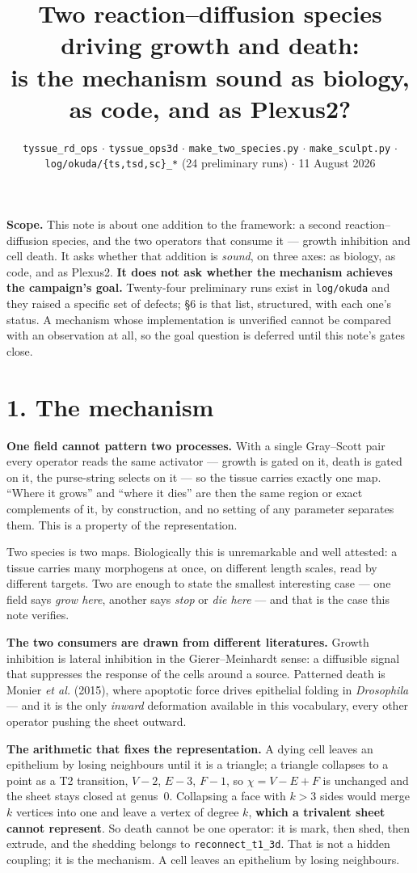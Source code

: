 \documentclass[10pt,a4paper]{article}
\title{\vspace{-1.4cm}\textbf{Two reaction--diffusion species driving growth and death:\\
\normalsize is the mechanism sound as biology, as code, and as Plexus2?}}
\author{}
\date{\vspace{-0.9cm}\small \texttt{tyssue\_rd\_ops} $\cdot$ \texttt{tyssue\_ops3d} $\cdot$
\texttt{make\_two\_species.py} $\cdot$ \texttt{make\_sculpt.py} $\cdot$
\texttt{log/okuda/\{ts,tsd,sc\}\_*} (24 preliminary runs) $\cdot$ 11 August 2026}
\newcommand{\code}[1]{\texttt{#1}}
\newcommand{\op}[1]{\texttt{#1}}
\begin{document}
\maketitle\vspace{-1.0cm}

\textbf{Scope.} This note is about one addition to the framework: a second reaction--diffusion
species, and the two operators that consume it --- growth inhibition and cell death. It asks whether
that addition is \emph{sound}, on three axes: as biology, as code, and as Plexus2. \textbf{It does
not ask whether the mechanism achieves the campaign's goal.} Twenty-four preliminary runs exist in
\code{log/okuda} and they raised a specific set of defects; \S6 is that list, structured, with each
one's status. A mechanism whose implementation is unverified cannot be compared with an observation
at all, so the goal question is deferred until this note's gates close.

\section*{1.\; The mechanism}

\textbf{One field cannot pattern two processes.} With a single Gray--Scott pair every operator reads
the same activator --- growth is gated on it, death is gated on it, the purse-string selects on it ---
so the tissue carries exactly one map. ``Where it grows'' and ``where it dies'' are then the same
region or exact complements of it, by construction, and no setting of any parameter separates them.
This is a property of the representation.

Two species is two maps. Biologically this is unremarkable and well attested: a tissue carries many
morphogens at once, on different length scales, read by different targets. Two are enough to state
the smallest interesting case --- one field says \emph{grow here}, another says \emph{stop} or
\emph{die here} --- and that is the case this note verifies.

\textbf{The two consumers are drawn from different literatures.} Growth inhibition is lateral
inhibition in the Gierer--Meinhardt sense: a diffusible signal that suppresses the response of the
cells around a source. Patterned death is Monier \emph{et al.} (2015), where apoptotic force drives
epithelial folding in \emph{Drosophila} --- and it is the only \emph{inward} deformation available
in this vocabulary, every other operator pushing the sheet outward.

\textbf{The arithmetic that fixes the representation.} A dying cell leaves an epithelium by losing
neighbours until it is a triangle; a triangle collapses to a point as a T2 transition, $V-2$, $E-3$,
$F-1$, so $\chi = V-E+F$ is unchanged and the sheet stays closed at genus~0. Collapsing a face with
$k>3$ sides would merge $k$ vertices into one and leave a vertex of degree $k$, \textbf{which a
trivalent sheet cannot represent}. So death cannot be one operator: it is mark, then shed, then
extrude, and the shedding belongs to \op{reconnect\_t1\_3d}. That is not a hidden coupling; it is
the mechanism. A cell leaves an epithelium by losing neighbours.
\end{document}
